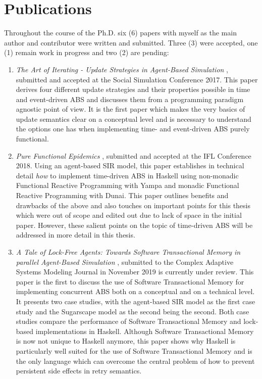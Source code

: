 \section*{Publications}
Throughout the course of the Ph.D. six (6) papers with myself as the main author and contributor were written and submitted. Three (3) were accepted, one (1) remain work in progress and two (2) are pending:

\begin{enumerate}
	\item \textit{The Art of Iterating - Update Strategies in Agent-Based Simulation} \cite{payne_social_2019, thaler_art_2017}, submitted and accepted at the Social Simulation Conference 2017. This paper derives four different update strategies and their properties possible in time and event-driven ABS and discusses them from a programming paradigm agnostic point of view. It is the first paper which makes the very basics of update semantics clear on a conceptual level and is necessary to understand the options one has when implementing time- and event-driven ABS purely functional.
	
	\item \textit{Pure Functional Epidemics} \cite{thaler_pure_2018}, submitted and accepted at the IFL Conference 2018. Using an agent-based SIR model, this paper establishes in technical detail \textit{how} to implement time-driven ABS in Haskell using non-monadic Functional Reactive Programming with Yampa and monadic Functional Reactive Programming with Dunai. This paper outlines benefits and drawbacks of the above and also touches on important points for this thesis which were out of scope and edited out due to lack of space in the initial paper. However, these salient points on the topic of time-driven ABS will be addressed in more detail in this thesis.

	\item \textit{A Tale of Lock-Free Agents: Towards Software Transactional Memory in parallel Agent-Based Simulation} \cite{thaler_tale_2018}, submitted to the Complex Adaptive Systems Modeling Journal in November 2019 is currently under review. This paper is the first to discuss the use of Software Transactional Memory for implementing concurrent ABS both on a conceptual and on a technical level. It presents two case studies, with the agent-based SIR model as the first case study and the Sugarscape model as the second being the second. Both case studies compare the performance of Software Transactional Memory and lock-based implementations in Haskell. Although Software Transactional Memory is now not unique to Haskell anymore, this paper shows why Haskell is particularly well suited for the use of Software Transactional Memory and is the only language which can overcome the central problem of how to prevent persistent side effects in retry semantics.


\end{enumerate}
